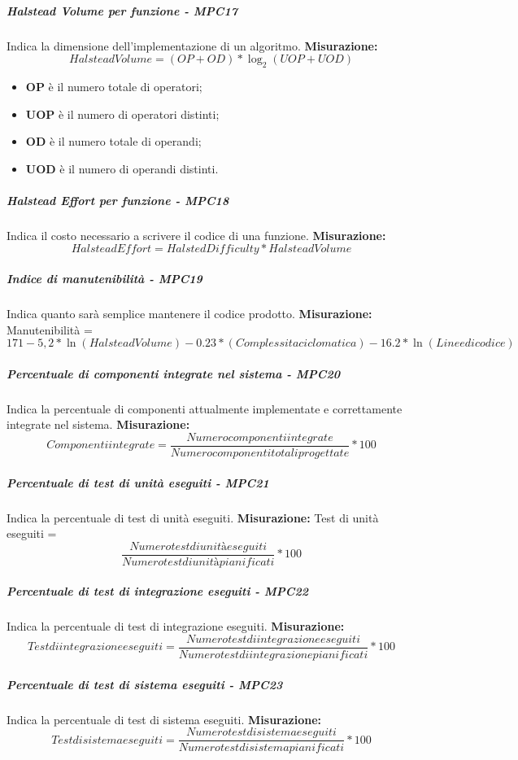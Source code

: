 \subparagraph{Halstead Volume per funzione - MPC17}
Indica la dimensione dell'implementazione di un algoritmo.
\textbf{Misurazione:}\begin{equation}
Halstead Volume = (OP + OD) * \log_2(UOP + UOD)
\end{equation}	
\begin{itemize}
	\item \textbf{OP} è il numero totale di operatori;
	\item \textbf{UOP} è il numero di operatori distinti;
	\item \textbf{OD} è il numero totale di operandi;
	\item \textbf{UOD} è il numero di operandi distinti.
\end{itemize}
\subparagraph{Halstead Effort per funzione - MPC18}
Indica il costo necessario a scrivere il codice di una funzione.
\textbf{Misurazione:}\begin{equation}
Halstead Effort = Halsted Difficulty * Halstead Volume
\end{equation}	
\subparagraph{Indice di manutenibilità - MPC19}
Indica quanto sarà semplice mantenere il codice prodotto.
\textbf{Misurazione:}
Manutenibilità = $171 - 5,2 * \ln(Halstead Volume) - 0.23 * (Complessita ciclomatica) - 16.2 * \ln(Linee di codice)$
\subparagraph{Percentuale di componenti integrate nel sistema - MPC20}
Indica la percentuale di componenti attualmente implementate e correttamente integrate nel sistema.
\textbf{Misurazione:}\begin{equation}
Componenti integrate = \frac{Numero componenti integrate}{Numero componenti totali progettate} * 100
\end{equation}
\subparagraph{Percentuale di test di unità eseguiti - MPC21}
Indica la percentuale di test di unità eseguiti.
\textbf{Misurazione:}
Test di unità eseguiti = 
\begin{equation} 
\frac{Numero test di unità eseguiti}{Numero test di unità pianificati} * 100
\end{equation}
\subparagraph{Percentuale di test di integrazione eseguiti - MPC22}
Indica la percentuale di test di integrazione eseguiti.
\textbf{Misurazione:}\begin{equation}
Test di integrazione eseguiti = \frac{Numero test di integrazione eseguiti}{Numero test di integrazione pianificati} * 100
\end{equation}
\subparagraph{Percentuale di test di sistema eseguiti - MPC23}
Indica la percentuale di test di sistema eseguiti.
\textbf{Misurazione:}\begin{equation}
Test di sistema eseguiti = \frac{Numero test di sistema eseguiti}{Numero test di sistema pianificati} * 100
\end{equation}
